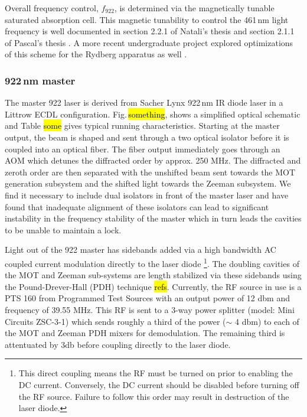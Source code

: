 Overall frequency control, $f_{922}$, is determined via the magnetically tunable saturated absorption cell.
This magnetic tunability to control the 461\,nm light frequency is well documented in section 2.2.1 of Natali's thesis \cite{MartinezdeEscolar2010} and section 2.1.1 of Pascal's thesis \cite{Mickelson2010b}.
A more recent undergraduate project explored optimizations of this scheme for the Rydberg apparatus as well \cite{MichaelViray2014}.

\subsubsection{922\,nm master}
The master 922 laser is derived from Sacher Lynx 922\,nm IR diode laser in a Littrow ECDL configuration.
Fig.\,\hl{something}, shows a simplified optical schematic and Table \hl{some} gives typical running characteristics.
Starting at the master output, the beam is shaped and sent through a two optical isolator before it is coupled into an optical fiber.
The fiber output immediately goes through an AOM which detunes the diffracted order by approx. 250 MHz.
The diffracted and zeroth order are then separated with the unshifted beam sent towards the MOT generation subsystem and the shifted light towards the Zeeman subsystem.
We find it necessary to include dual isolators in front of the master laser and have found that inadequate alignment of these isolators can lead to significant instability in the frequency stability of the master which in turn leads the cavities to be unable to maintain a lock.

Light out of the 922 master has sidebands added via a high bandwidth AC coupled current modulation directly to the laser diode 
\footnote{This direct coupling means the RF must be turned on prior to enabling the DC current. 
Conversely, the DC current should be disabled before turning off the RF source. 
Failure to follow this order may result in destruction of the laser diode.}.
The doubling cavities of the MOT and Zeeman sub-systems are length stabilized via these sidebands using the Pound-Drever-Hall (PDH) technique \hl{refs}.
Currently, the RF source in use is a PTS 160 from Programmed Test Sources with an output power of 12 dbm and frequency of 39.55 MHz.
This RF is sent to a 3-way power splitter (model: Mini Circuits ZSC-3-1) which sends roughly a third of the power ($\sim$ 4 dbm) to each of the MOT and Zeeman PDH mixers for demodulation. 
The remaining third is attentuated by 3db before coupling directly to the laser diode.

